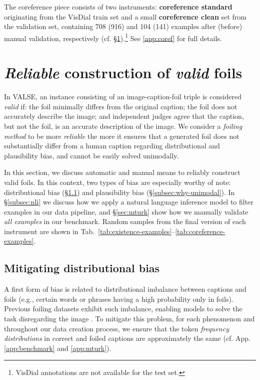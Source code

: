 \documentclass[11pt]{article}
\newcommand{\dataset}{VALSE}
\begin{document}
The coreference piece consists of two instruments: \textbf{coreference standard} originating from the VisDial train set and a small \textbf{coreference clean} set from the validation set, containing 708 (916) and 104 (141) examples after (before) manual validation, respectively (cf. \S \ref{sec:foiling}).\footnote{VisDial annotations are not available for the test set.} See  \ref{app:coref} for full details.

\section{\emph{Reliable} construction of \emph{valid} foils}
\label{sec:foiling}


In \dataset{}, an instance consisting of an image-caption-foil triple is considered {\em valid} if:
the foil minimally differs from the original caption;
the foil does not accurately describe the image;
and independent judges agree that the caption, but not the foil, is an accurate description of the image. 
We consider 
a \textit{foiling method} to be
more {\em reliable} the more it ensures that a generated foil does not substantially differ from a human caption regarding distributional and plausibility bias, and cannot be easily solved unimodally.  

In this section, we discuss automatic and manual means to reliably construct valid foils.
In this context, two types of bias are especially worthy of note:
distributional bias (\S\ref{sec:dist-bias}) and plausibility bias (\S\ref{subsec:why-unimodal}).
In \S\ref{subsec:nli} we discuss how we apply a natural language inference model to filter examples in our data pipeline, and \S\ref{sec:mturk} show how we manually validate \textit{all examples} in our benchmark.
Random samples from the final version of each instrument are shown in Tab.\ \ref{tab:existence-examples}--\ref{tab:coreference-examples}.

\subsection{Mitigating distributional bias}\label{sec:dist-bias}
A first form of bias is related to distributional imbalance between captions and foils (e.g., certain words or phrases having a high probability only in foils).
Previous foiling datasets
exhibit such
imbalance, enabling models to solve the task disregarding the image  \cite{madhyastha-etal-2019-vifidel}.
To mitigate this problem, for each phenomenon and throughout our data creation process, we ensure that the token \textit{frequency distributions} in correct and foiled captions are approximately the same
(cf. App. \ref{app:benchmark} and \ref{app:mturk}).
\end{document}
